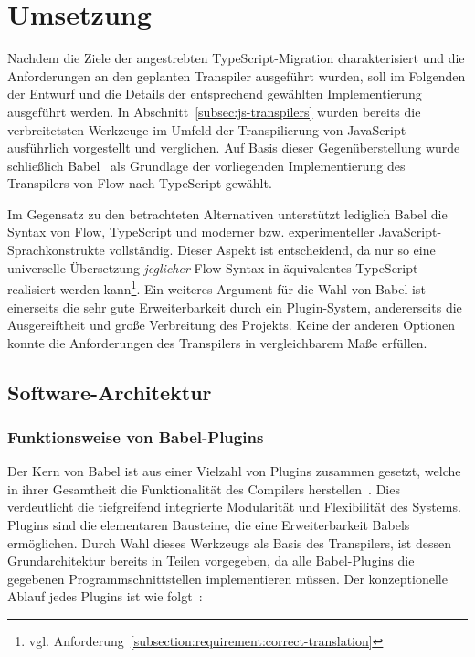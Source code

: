 \chapter{Umsetzung}

Nachdem die Ziele der angestrebten TypeScript-Migration charakterisiert und die Anforderungen an den geplanten Transpiler ausgeführt wurden, soll im Folgenden der Entwurf und die Details der entsprechend gewählten Implementierung ausgeführt werden.
In Abschnitt~\ref{subsec:js-transpilers} wurden bereits die verbreitetsten Werkzeuge im Umfeld der Transpilierung von JavaScript ausführlich vorgestellt und verglichen. Auf Basis dieser Gegenüberstellung wurde schließlich Babel~\autocite{BABEL} als Grundlage der vorliegenden Implementierung des Transpilers von Flow nach TypeScript gewählt.

Im Gegensatz zu den betrachteten Alternativen unterstützt lediglich Babel die Syntax von Flow, TypeScript und moderner bzw. experimenteller JavaScript-Sprachkonstrukte vollständig. Dieser Aspekt ist entscheidend, da nur so eine universelle Übersetzung \emph{jeglicher} Flow-Syntax in äquivalentes TypeScript realisiert werden kann\footnote{vgl. Anforderung~\ref{subsection:requirement:correct-translation}}. Ein weiteres Argument für die Wahl von Babel ist einerseits die sehr gute Erweiterbarkeit durch ein Plugin-System, andererseits die Ausgereiftheit und große Verbreitung des Projekts. Keine der anderen Optionen konnte die Anforderungen des Transpilers in vergleichbarem Maße erfüllen.

\section{Software-Architektur}

\subsection{Funktionsweise von Babel-Plugins}

Der Kern von Babel ist aus einer Vielzahl von Plugins zusammen gesetzt, welche in ihrer Gesamtheit die Funktionalität des Compilers herstellen~\autocite{BABEL}. Dies verdeutlicht die tiefgreifend integrierte Modularität und Flexibilität des Systems. Plugins sind die elementaren Bausteine, die eine Erweiterbarkeit Babels ermöglichen. Durch Wahl dieses Werkzeugs als Basis des Transpilers, ist dessen Grundarchitektur bereits in Teilen vorgegeben, da alle Babel-Plugins die gegebenen Programmschnittstellen implementieren müssen. Der konzeptionelle Ablauf jedes Plugins ist wie folgt~\autocite{BABEL_HANDBOOK}:

